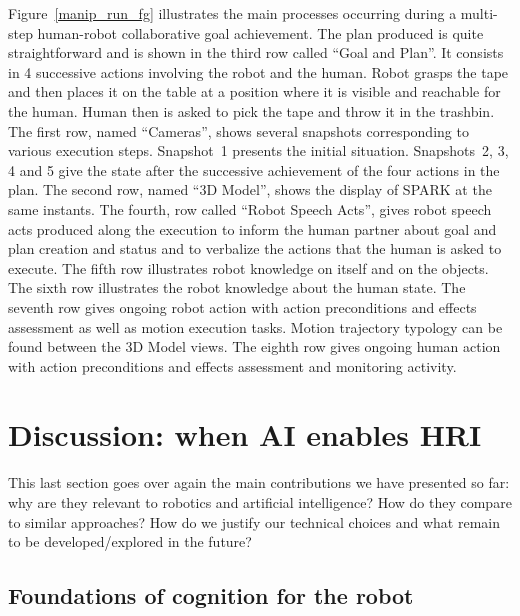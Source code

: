 \documentclass[preprint,5p]{elsarticle}
\begin{document}
Figure~\ref{manip_run_fg} illustrates the main processes occurring
during a multi-step human-robot collaborative goal achievement.  The
plan produced is quite straightforward and is shown in the third row
called ``Goal and Plan''. It consists in 4 successive actions
involving the robot and the human. Robot grasps the tape and then
places it on the table at a position where it is visible and reachable
for the human. Human then is asked to pick the tape and throw it in
the trashbin. The first row, named ``Cameras'', shows several
snapshots corresponding to various execution steps. Snapshot~1
presents the initial situation. Snapshots~2, 3, 4 and 5 give the state
after the successive achievement of the four actions in the plan. The
second row, named ``3D Model'', shows the display of SPARK at the same
instants. The fourth, row called ``Robot Speech Acts'', gives robot
speech acts produced along the execution to inform the human partner
about goal and plan creation and status and to verbalize the actions
that the human is asked to execute. The fifth row illustrates robot
knowledge on itself and on the objects. The sixth row illustrates the
robot knowledge about the human state. The seventh row gives ongoing
robot action with action preconditions and effects assessment as well
as motion execution tasks. Motion trajectory typology can be found
between the 3D Model views. The eighth row gives ongoing human action
with action preconditions and effects assessment and monitoring
activity.



\section{Discussion: when AI enables HRI}
\label{sect|conclusion}

This last section goes over again the main contributions we have presented
so far: why are they relevant to robotics and artificial intelligence? How do
they compare to similar approaches? How do we justify our technical choices and
what remain to be developed/explored in the future?

\subsection{Foundations of cognition for the robot}
\end{document}
